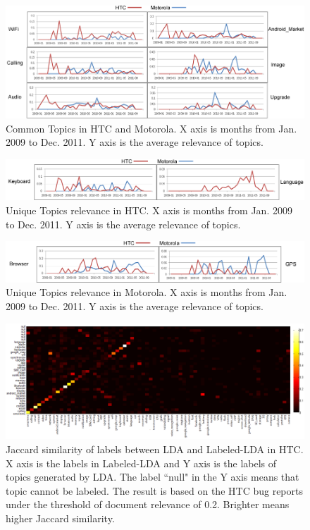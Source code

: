 \documentclass[10pt, conference, compsocconf]{IEEEtran}
\begin{document}
\begin{figure}[htb]
\centering
\includegraphics[width=1\textwidth]{fixtopic.png}
\caption{Common Topics in HTC and Motorola. X axis is months from Jan. 2009 to Dec. 2011. Y axis is the average relevance of topics.}
\label{fixtopic}
\end{figure}

\begin{figure}[htb]
\centering
\includegraphics[width=1\textwidth]{uniquehtc.png}
\caption{Unique Topics relevance in HTC. X axis is months from Jan. 2009 to Dec. 2011. Y axis is the average relevance of topics.}
\label{uniquehtc}
\end{figure}

\begin{figure}[htb]
\centering
\includegraphics[width=1\textwidth]{uniquemoto.png}
\caption{Unique Topics relevance in Motorola. X axis is months from Jan. 2009 to Dec. 2011. Y axis is the average relevance of topics.}
\label{uniquemoto}
\end{figure}

\begin{figure}[htb]
\centering
\includegraphics[width=1\textwidth]{htcsim.png}
\caption{Jaccard similarity of labels between LDA and Labeled-LDA in HTC. X axis is the labels in Labeled-LDA and Y axis is the labels of topics generated by LDA. The label ``null" in the Y axis means that topic cannot be labeled. The result is based on the HTC bug reports under the threshold of document relevance of 0.2. Brighter means higher Jaccard similarity.}
\label{similarityhtc}
\end{figure}
\end{document}
